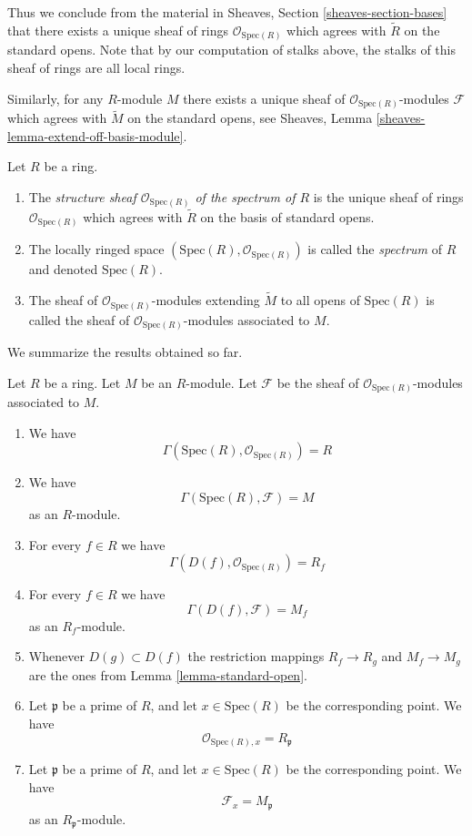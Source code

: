 \medskip\noindent
Thus we conclude from the material in
Sheaves, Section \ref{sheaves-section-bases}
that there exists a
unique sheaf of rings $\mathcal{O}_{\text{Spec}(R)}$
which agrees with $\widetilde R$ on the standard opens.
Note that by our computation of stalks above, the
stalks of this sheaf of rings are all local rings.

\medskip\noindent
Similarly, for any $R$-module $M$ there exists
a unique sheaf of $\mathcal{O}_{\text{Spec}(R)}$-modules
$\mathcal{F}$ which agrees with $\widetilde M$ on the
standard opens, see
Sheaves, Lemma \ref{sheaves-lemma-extend-off-basis-module}.

\begin{definition}
\label{definition-structure-sheaf}
Let $R$ be a ring.
\begin{enumerate}
\item The {\it structure sheaf $\mathcal{O}_{\text{Spec}(R)}$ of the
spectrum of $R$} is the unique sheaf of rings $\mathcal{O}_{\text{Spec}(R)}$
which agrees with $\widetilde R$ on the basis of standard opens.
\item The locally ringed space
$(\text{Spec}(R), \mathcal{O}_{\text{Spec}(R)})$ is called
the {\it spectrum} of $R$ and denoted $\text{Spec}(R)$.
\item The sheaf of $\mathcal{O}_{\text{Spec}(R)}$-modules
extending $\widetilde M$ to all opens of $\text{Spec}(R)$
is called the sheaf of $\mathcal{O}_{\text{Spec}(R)}$-modules
associated to $M$.
\end{enumerate}
\end{definition}

\noindent
We summarize the results obtained so far.

\begin{lemma}
\label{lemma-spec-sheaves}
Let $R$ be a ring. Let $M$ be an $R$-module. Let $\mathcal{F}$
be the sheaf of $\mathcal{O}_{\text{Spec}(R)}$-modules
associated to $M$.
\begin{enumerate}
\item We have
$$
\Gamma(\text{Spec}(R), \mathcal{O}_{\text{Spec}(R)}) = R
$$
\item We have
$$
\Gamma(\text{Spec}(R), \mathcal{F}) = M
$$
as an $R$-module.
\item For every $f \in R$ we have 
$$
\Gamma(D(f), \mathcal{O}_{\text{Spec}(R)}) = R_f
$$
\item For every $f\in R$ we have
$$
\Gamma(D(f), \mathcal{F}) = M_f
$$
as an $R_f$-module.
\item Whenever $D(g) \subset D(f)$ the restriction mappings
$R_f \to R_g$ and $M_f \to M_g$ are the ones from Lemma
\ref{lemma-standard-open}.
\item Let $\mathfrak p$ be a prime of $R$, and let $x \in \text{Spec}(R)$
be the corresponding point. We have
$$
\mathcal{O}_{\text{Spec}(R), x} = R_{\mathfrak p}
$$
\item Let $\mathfrak p$ be a prime of $R$, and let $x \in \text{Spec}(R)$
be the corresponding point. We have
$$
\mathcal{F}_x = M_{\mathfrak p}
$$
as an $R_{\mathfrak p}$-module.
\end{enumerate}
\end{lemma}

